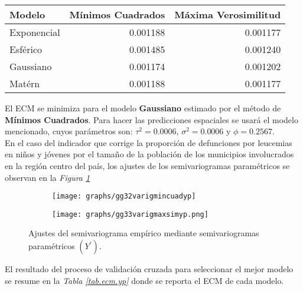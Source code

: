 \documentclass[11pt, oneside]{book}
\begin{document}
\begingroup
    \fontsize{10pt}{12pt}\selectfont
\begin{table}[ht]
\centering
\begin{tabular}{lrr}
  \hline
Modelo & Mínimos Cuadrados & Máxima Verosimilitud \\ 
  \hline
  Exponencial & 0.001188 & 0.001177 \\
  Esférico    & 0.001485 & 0.001240 \\
  Gaussiano   & 0.001174 & 0.001202 \\
  Matérn      & 0.001188 & 0.001177 \\
   \hline
\end{tabular}
\label{tab.ecm.y}
\end{table}
\endgroup

El ECM se minimiza para el modelo \textbf{Gaussiano} estimado por el método de \textbf{Mínimos Cuadrados}. Para hacer las predicciones espaciales se usará el modelo mencionado, cuyos parámetros son: $\tau^2 = 0\textrm{.}0006$, $\sigma^2 = 0\textrm{.}0006$ y $\phi = 0\textrm{.}2567$.\\ 

En el caso del indicador que corrige la proporción de defunciones por leucemias en niños y jóvenes por el tamaño de la población de los municipios involucrados en la región centro del país, los ajustes de los semivariogramas paramétricos se observan en la \emph{Figura \ref{fig32y33.ajusvaryp}}

  \begin{figure}[ht]
  \begin{subfigure}{.5\textwidth}
	  \centering
	  \texttt{[image: graphs/gg32varigmincuadyp]}
	\end{subfigure}%
	\begin{subfigure}{.5\textwidth}
	  \centering
    \texttt{[image: graphs/gg33varigmaxsimyp.png]}
	\end{subfigure}
  \caption{Ajustes del semivariograma empírico mediante semivariogramas paramétricos $(Y^{'})$.}
    \label{fig32y33.ajusvaryp}
\end{figure}

El resultado del proceso de validación cruzada para seleccionar el mejor modelo se resume en la \emph{Tabla \ref{tab.ecm.yp}} donde se reporta el ECM de cada modelo.\\
\end{document}
